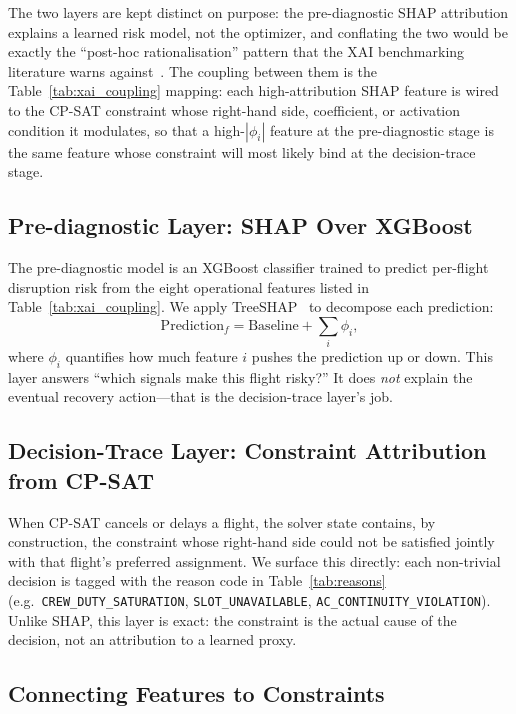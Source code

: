 \documentclass[12pt,number]{elsarticle}
\begin{document}
The two layers are kept distinct on purpose: the pre-diagnostic SHAP attribution explains a learned risk model, not the optimizer, and conflating the two would be exactly the ``post-hoc rationalisation'' pattern that the XAI benchmarking literature warns against~\cite{nauta2023}. The coupling between them is the Table~\ref{tab:xai_coupling} mapping: each high-attribution SHAP feature is wired to the CP-SAT constraint whose right-hand side, coefficient, or activation condition it modulates, so that a high-$|\phi_i|$ feature at the pre-diagnostic stage is the same feature whose constraint will most likely bind at the decision-trace stage.

\subsection{Pre-diagnostic Layer: SHAP Over XGBoost}
\label{sec:xai_prediag}

The pre-diagnostic model is an XGBoost classifier trained to predict per-flight disruption risk from the eight operational features listed in Table~\ref{tab:xai_coupling}. We apply TreeSHAP~\cite{lundberg2020} to decompose each prediction:
\begin{equation}
\mathrm{Prediction}_f = \mathrm{Baseline} + \sum_{i} \phi_i,
\label{eq:shap}
\end{equation}
where $\phi_i$ quantifies how much feature $i$ pushes the prediction up or down. This layer answers ``which signals make this flight risky?'' It does \emph{not} explain the eventual recovery action---that is the decision-trace layer's job.

\subsection{Decision-Trace Layer: Constraint Attribution from CP-SAT}
\label{sec:xai_trace}

When CP-SAT cancels or delays a flight, the solver state contains, by construction, the constraint whose right-hand side could not be satisfied jointly with that flight's preferred assignment. We surface this directly: each non-trivial decision is tagged with the reason code in Table~\ref{tab:reasons} (e.g.\ \texttt{CREW\_DUTY\_SATURATION}, \texttt{SLOT\_UNAVAILABLE}, \texttt{AC\_CONTINUITY\_VIOLATION}). Unlike SHAP, this layer is exact: the constraint is the actual cause of the decision, not an attribution to a learned proxy.

\subsection{Connecting Features to Constraints}
\label{sec:xai_coupling}
\end{document}
